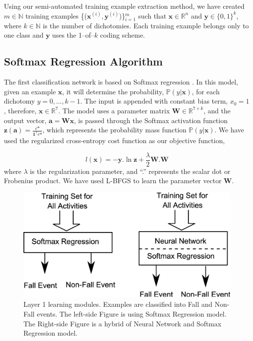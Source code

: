 \documentclass[]{IEEEtran}
\begin{document}
Using our semi-automated training example extraction method, we have created $m \in 
\mathbb{N}$ 
training examples 
\{($\mathbf{x}^{(i)}, \mathbf{y}^{(i)}$)\}$_{i=1}^m$ such that $\mathbf{x} \in 
\mathbb{R}^{n}$ 
and 
$\mathbf{y} \in 
\{0,1\}^k$, where  $k \in 
\mathbb{N}$ is the number of dichotomies. Each training example belongs only to one class 
and $\mathbf{y}$ uses the 1--of--$k$ coding scheme.    

\subsection{Softmax Regression Algorithm}
\label{sec:SoftmaxRegrationAlgorthm}

The first classification network is based on Softmax regression \cite{Bishop06a}. In this 
model, given an 
example $\mathbf{x}$, it will determine the probability, $\mathbb{P}(y | \mathbf{x})$, 
for 
each dichotomy $y=0,\ldots,k-1$. The input is appended with constant bias 
term, $x_0 = 1$, therefore, $\mathbf{x} \in \mathbb{R}^7$. The model uses a parameter 
matrix 
$\mathbf{W} 
\in \mathbb{R}^{7 \times k}$, and the output vector, $\mathbf{a} = \mathbf{Wx}$, is 
passed 
through 
the 
Softmax 
activation function $\mathbf{z(a)} = \frac{e^{\mathbf{a}}}{\mathbf{1}^\mathtt{T}
e^{\mathbf{a}}}$, which represents the probability mass function $\mathbb{P}(y | 
\mathbf{x})$. We have 
used the regularized cross-entropy cost function as our objective function, 

\begin{equation} 
l(\mathbf{x}) = -\mathbf{y}.\ln \mathbf{z} + \frac{\lambda}{2} \mathbf{W}.\mathbf{W}
\label{eq:objective-function}
\end{equation}
 where  $\lambda$ is the regularization parameter, and ``.'' represents the scalar dot  
or Frobenius product.
 We have used L-BFGS \cite{DBLP:conf/icml/LeNCLPN11} to learn the 
parameter vector $\mathbf{W}$.  

\begin{figure}[htbp]
	\centering
		\includegraphics[width=0.75\columnwidth]{figures/SoftmaxLayer1.eps}
	\caption{Layer 1 learning modules. Examples are classified into Fall and Non-Fall events.  The left-side Figure is using Softmax Regression model. The Right-side Figure is a hybrid of Neural Network and Softmax Regression model.}
	\label{fig:SoftmaxLayer1}
\end{figure}
\end{document}
